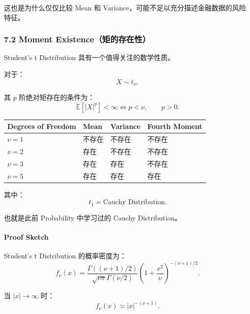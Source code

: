 这也是为什么仅仅比较 Mean 和 Variance，可能不足以充分描述金融数据的风险特征。

\hypertarget{part-4-58-0007-moment-existenceux77e9ux7684ux5b58ux5728ux6027}{%
\subsubsection{7.2 Moment Existence（矩的存在性）}\label{part-4-58-0007-moment-existenceux77e9ux7684ux5b58ux5728ux6027}}

Student's t Distribution 具有一个值得关注的数学性质。

对于：
\[X\sim t_\nu,\]

其 \(p\) 阶绝对矩存在的条件为：
\[\boxed{
\mathbb E[|X|^p]<\infty
\iff p<\nu,
\qquad p>0.
}\]

\begin{readertable}
\begin{longtable}[]{@{}
  >{\raggedright\arraybackslash}p{}
  >{\raggedright\arraybackslash}p{}
  >{\raggedright\arraybackslash}p{}
  >{\raggedright\arraybackslash}p{}@{}}
\toprule
Degrees of Freedom & Mean & Variance & Fourth Moment \\
\midrule
\endhead
\(\nu=1\) & 不存在 & 不存在 & 不存在 \\
\(\nu=2\) & 存在 & 不存在 & 不存在 \\
\(\nu=3\) & 存在 & 存在 & 不存在 \\
\(\nu=5\) & 存在 & 存在 & 存在 \\
\bottomrule
\end{longtable}
\end{readertable}

其中：
\[t_1=\text{Cauchy Distribution}.\]

也就是此前 Probability 中学习过的 Cauchy Distribution。

\hypertarget{part-4-58-0007-proof-sketch}{%
\paragraph{Proof Sketch}\label{part-4-58-0007-proof-sketch}}

Student's t Distribution 的概率密度为：
\[f_\nu(x)
=
\frac{
\Gamma((\nu+1)/2)
}{
\sqrt{\nu\pi}\Gamma(\nu/2)
}
\left(1+\frac{x^2}{\nu}\right)^{-(\nu+1)/2}.\]

当 \(|x|\to\infty\) 时：
\[f_\nu(x)\asymp |x|^{-(\nu+1)}.\]

